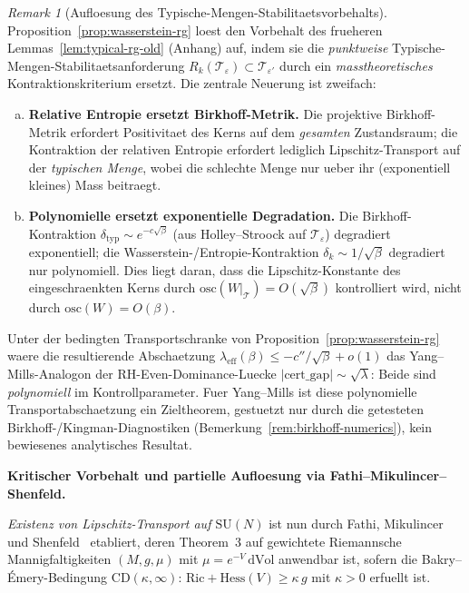 \documentclass[12pt,a4paper]{article}
\theoremstyle{definition}
\theoremstyle{plain}
\theoremstyle{remark}
\newtheorem{remark}[definition]{Remark}
\begin{document}
\begin{remark}[Aufloesung des Typische-Mengen-Stabilitaetsvorbehalts]\label{rem:wasserstein-rg-significance}
Proposition~\ref{prop:wasserstein-rg} loest den Vorbehalt des frueheren
Lemmas~\ref{lem:typical-rg-old} (Anhang) auf, indem sie die
\emph{punktweise} Typische-Mengen-Stabilitaetsanforderung
$R_k(\mathcal{T}_\varepsilon) \subset \mathcal{T}_{\varepsilon'}$
durch ein \emph{masstheoretisches} Kontraktionskriterium ersetzt.
Die zentrale Neuerung ist zweifach:
\begin{enumerate}[(a)]
\item \textbf{Relative Entropie ersetzt Birkhoff-Metrik.}
  Die projektive Birkhoff-Metrik erfordert Positivitaet des Kerns auf dem
  \emph{gesamten} Zustandsraum; die Kontraktion der relativen Entropie erfordert
  lediglich Lipschitz-Transport auf der \emph{typischen Menge}, wobei die schlechte Menge
  nur ueber ihr (exponentiell kleines) Mass beitraegt.
\item \textbf{Polynomielle ersetzt exponentielle Degradation.}
  Die Birkhoff-Kontraktion $\delta_{\mathrm{typ}} \sim e^{-c\sqrt{\beta}}$
  (aus Holley--Stroock auf $\mathcal{T}_\varepsilon$) degradiert exponentiell;
  die Wasserstein-/Entropie-Kontraktion $\delta_k \sim 1/\sqrt{\beta}$
  degradiert nur polynomiell. Dies liegt daran, dass die Lipschitz-Konstante
  des eingeschraenkten Kerns durch
  $\mathrm{osc}(W|_{\mathcal{T}}) = O(\sqrt{\beta})$ kontrolliert wird,
  nicht durch $\mathrm{osc}(W) = O(\beta)$.
\end{enumerate}
Unter der bedingten Transportschranke von Proposition~\ref{prop:wasserstein-rg}
waere die resultierende Abschaetzung
$\lambda_{\mathrm{eff}}(\beta) \leq -c''/\sqrt{\beta} + o(1)$
das Yang--Mills-Analogon der RH-Even-Dominance-Luecke
$|\mathrm{cert\_gap}| \sim \sqrt{\lambda}$: Beide sind \emph{polynomiell}
im Kontrollparameter. Fuer Yang--Mills ist diese polynomielle
Transportabschaetzung ein Zieltheorem, gestuetzt nur durch die getesteten
Birkhoff-/Kingman-Diagnostiken (Bemerkung~\ref{rem:birkhoff-numerics}), kein
bewiesenes analytisches Resultat.

\textbf{Kritischer Vorbehalt und partielle Aufloesung via Fathi--Mikulincer--Shenfeld.}

\emph{Existenz von Lipschitz-Transport auf $\mathrm{SU}(N)$} ist nun
durch Fathi, Mikulincer und Shenfeld~\cite{FathiMikulincerShenfeld2024}
etabliert, deren Theorem~3 auf gewichtete Riemannsche Mannigfaltigkeiten $(M,g,\mu)$ mit
$\mu = e^{-V}\,\mathrm{d Vol}$ anwendbar ist, sofern die Bakry--\'Emery-Bedingung
$\mathrm{CD}(\kappa, \infty)$: $\mathrm{Ric} + \mathrm{Hess}(V) \geq \kappa\,g$
mit $\kappa > 0$ erfuellt ist.


\end{remark}
\end{document}
